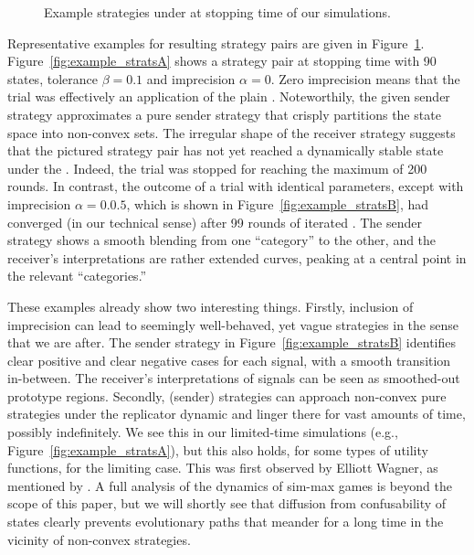 \documentclass[fleqn,reqno,10pt]{article}
\newcommand{\rd}{\acro{rd}} %
\newcommand{\rdd}{\acro{rdd}} %
\newcommand{\imprecision}{\ensuremath{\alpha}} %
\newcommand{\toler}{\ensuremath{\beta}} %
\newcommand{\ns}{\ensuremath{n_s}} %
\begin{document}
\begin{figure}


  \caption{Example strategies under \rdd at stopping time of our simulations.}
  \label{fig:example_strats}
\end{figure}

 Representative examples for resulting strategy pairs are given in
Figure~\ref{fig:example_strats}. Figure~\ref{fig:example_stratsA} shows a strategy pair at
stopping time with 90 states, tolerance $\toler = 0.1$ and imprecision $\imprecision = 0$. Zero
imprecision means that the trial was effectively an application of the plain \rd. Noteworthily,
the given sender strategy approximates a pure sender strategy that crisply partitions the state
space into non-convex sets. The irregular shape of the receiver strategy suggests that the
pictured strategy pair has not yet reached a dynamically stable state under the \rd. Indeed,
the trial was stopped for reaching the maximum of 200 rounds. In contrast, the outcome of a
trial with identical parameters, except with imprecision $\imprecision = 0.0.5$, which is shown
in Figure~\ref{fig:example_stratsB}, had converged (in our technical sense) after 99 rounds of
iterated \rdd. The sender strategy shows a smooth blending from one ``category'' to the other,
and the receiver's interpretations are rather extended curves, peaking at a central point in
the relevant ``categories.''

These examples already show two interesting things. Firstly, inclusion of imprecision can lead
to seemingly well-behaved, yet vague strategies in the sense that we are after. The sender
strategy in Figure~\ref{fig:example_stratsB} identifies clear positive and clear negative cases
for each signal, with a smooth transition in-between. The receiver's interpretations of signals
can be seen as smoothed-out prototype regions. Secondly, (sender) strategies can approach
non-convex pure strategies under the replicator dynamic and linger there for vast amounts of
time, possibly indefinitely. We see this in our limited-time simulations (e.g.,
Figure~\ref{fig:example_stratsA}), but this also holds, for some types of utility functions,
for the limiting case. This was first observed by Elliott Wagner, as mentioned by
\citet{OConnor2014-OCOEPC}.  A full analysis of the dynamics of sim-max games is beyond the
scope of this paper, but we will shortly see that diffusion from confusability of states
clearly prevents evolutionary paths that meander for a long time in the vicinity of non-convex
strategies.
\end{document}
